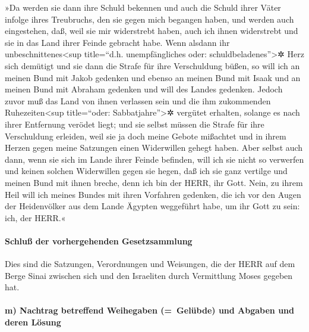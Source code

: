 »Da werden sie dann ihre Schuld bekennen und auch die
Schuld ihrer Väter infolge ihres Treubruchs, den sie gegen mich begangen
haben, und werden auch eingestehen, daß, weil sie mir widerstrebt haben,
auch ich ihnen widerstrebt und sie in das Land ihrer
Feinde gebracht habe. Wenn alsdann ihr unbeschnittenes\textless sup
title=``d.h. unempfängliches oder: schuldbeladenes''\textgreater✲ Herz
sich demütigt und sie dann die Strafe für ihre Verschuldung büßen,
so will ich an meinen Bund mit Jakob gedenken und ebenso
an meinen Bund mit Isaak und an meinen Bund mit Abraham gedenken und
will des Landes gedenken. Jedoch zuvor muß das Land von
ihnen verlassen sein und die ihm zukommenden Ruhezeiten\textless sup
title=``oder: Sabbatjahre''\textgreater✲ vergütet erhalten, solange es
nach ihrer Entfernung verödet liegt; und sie selbst müssen die Strafe
für ihre Verschuldung erleiden, weil sie ja doch meine Gebote mißachtet
und in ihrem Herzen gegen meine Satzungen einen Widerwillen gehegt
haben. Aber selbst auch dann, wenn sie sich im Lande
ihrer Feinde befinden, will ich sie nicht so verwerfen und keinen
solchen Widerwillen gegen sie hegen, daß ich sie ganz vertilge und
meinen Bund mit ihnen breche, denn ich bin der HERR, ihr Gott.
Nein, zu ihrem Heil will ich meines Bundes mit ihren
Vorfahren gedenken, die ich vor den Augen der Heidenvölker aus dem Lande
Ägypten weggeführt habe, um ihr Gott zu sein: ich, der HERR.«

\hypertarget{schluuxdf-der-vorhergehenden-gesetzsammlung}{%
\paragraph{Schluß der vorhergehenden
Gesetzsammlung}\label{schluuxdf-der-vorhergehenden-gesetzsammlung}}

Dies sind die Satzungen, Verordnungen und Weisungen, die
der HERR auf dem Berge Sinai zwischen sich und den Israeliten durch
Vermittlung Moses gegeben hat.

\hypertarget{m-nachtrag-betreffend-weihegaben-geluxfcbde-und-abgaben-und-deren-luxf6sung}{%
\paragraph{m) Nachtrag betreffend Weihegaben (=~Gelübde) und Abgaben und
deren
Lösung}\label{m-nachtrag-betreffend-weihegaben-geluxfcbde-und-abgaben-und-deren-luxf6sung}}

